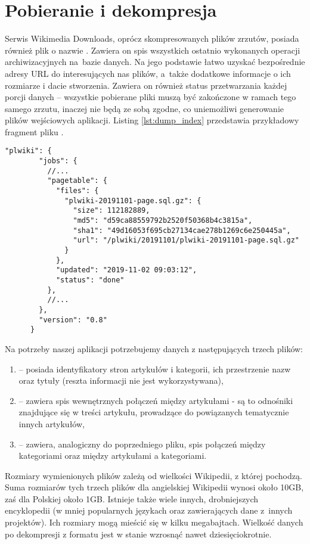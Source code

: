 \section{Pobieranie i dekompresja}
\label{sec:data-download}
Serwis Wikimedia Downloads, oprócz skompresowanych plików zrzutów, posiada również plik o nazwie . Zawiera on spis wszystkich ostatnio wykonanych operacji archiwizacyjnych na~bazie danych. Na jego podstawie łatwo uzyskać bezpośrednie adresy URL do interesujących nas plików, a~także dodatkowe informacje o ich rozmiarze i dacie stworzenia. Zawiera on również status przetwarzania każdej porcji danych – wszystkie pobierane pliki muszą być zakończone w ramach tego samego zrzutu, inaczej nie będą ze sobą zgodne, co uniemożliwi generowanie plików wejściowych aplikacji. Listing \ref{lst:dump_index} przedstawia przykładowy fragment pliku .

\begin{lstlisting}[frame=single,caption={Fragment informacji o ostatnim zrzucie bazy danych polskiej Wikipedii},label=lst:dump_index]
    "plwiki": {
        "jobs": {
          //...
          "pagetable": {
            "files": {
              "plwiki-20191101-page.sql.gz": {
                "size": 112182889,
                "md5": "d59ca88559792b2520f50368b4c3815a",
                "sha1": "49d16053f695cb27134cae278b1269c6e250445a",
                "url": "/plwiki/20191101/plwiki-20191101-page.sql.gz"
              }
            },
            "updated": "2019-11-02 09:03:12",
            "status": "done"
          },
          //...
        },
        "version": "0.8"
      }      
\end{lstlisting}

Na potrzeby naszej aplikacji potrzebujemy danych z następujących trzech plików:

\begin{enumerate}[label=\textbullet]
    \item {} – posiada identyfikatory stron artykułów i kategorii, ich przestrzenie nazw oraz tytuły (reszta informacji nie jest wykorzystywana),
    \item {} – zawiera spis wewnętrznych połączeń między artykułami - są to odnośniki znajdujące się w treści artykułu, prowadzące do powiązanych tematycznie innych artykułów,
    \item {} – zawiera, analogiczny do poprzedniego pliku, spis połączeń między kategoriami oraz między artykułami a kategoriami.
\end{enumerate}

Rozmiary wymienionych plików zależą od wielkości Wikipedii, z której pochodzą. Suma rozmiarów tych trzech plików dla angielskiej Wikipedii wynosi około 10GB, zaś dla Polskiej około 1GB. Istnieje także wiele innych, drobniejszych encyklopedii (w mniej popularnych językach oraz zawierających dane z~innych projektów). Ich rozmiary mogą mieścić się w kilku megabajtach. Wielkość danych po dekompresji z formatu  jest w stanie wzrosnąć nawet dziesięciokrotnie.
\newpage
